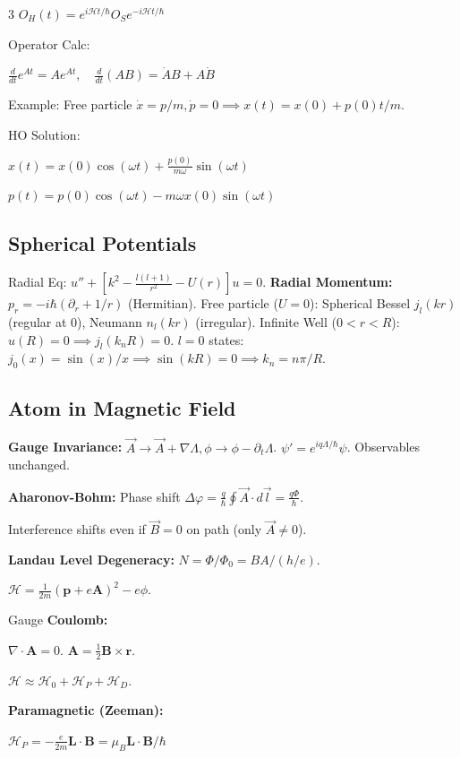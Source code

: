 \documentclass[10pt,a4paper]{article}
\begin{document}
\begin{multicols*}{3}
$O_H(t) = e^{i\mathcal{H}t/\hbar} O_S e^{-i\mathcal{H}t/\hbar}$

Operator Calc: 

$\frac{d}{dt}e^{At} = A e^{At}, \quad \frac{d}{dt}(AB) = \dot{A}B + A\dot{B}$

Example: Free particle $\dot{x} = p/m, \dot{p} = 0 \implies x(t) = x(0) + p(0)t/m$.

HO Solution: 

$x(t) = x(0)\cos(\omega t) + \frac{p(0)}{m\omega}\sin(\omega t)$

$p(t) = p(0)\cos(\omega t) - m\omega x(0)\sin(\omega t)$

\subsection*{Spherical Potentials}
Radial Eq: $u'' + [k^2 - \frac{l(l+1)}{r^2} - U(r)]u = 0$.
\textbf{Radial Momentum:} $p_r = -i\hbar(\partial_r + 1/r)$ (Hermitian).
Free particle ($U=0$): Spherical Bessel $j_l(kr)$ (regular at 0), Neumann $n_l(kr)$ (irregular).
Infinite Well ($0 < r < R$): $u(R)=0 \implies j_l(k_n R) = 0$.
$l=0$ states: $j_0(x) = \sin(x)/x \implies \sin(kR)=0 \implies k_n = n\pi/R$.

\subsection*{Atom in Magnetic Field}
\textbf{Gauge Invariance:} $\vec{A} \to \vec{A} + \nabla\Lambda, \phi \to \phi - \partial_t\Lambda$.
$\psi' = e^{iq\Lambda/\hbar}\psi$. Observables unchanged.

\textbf{Aharonov-Bohm:} Phase shift $\Delta\varphi = \frac{q}{\hbar} \oint \vec{A}\cdot d\vec{l} = \frac{q\Phi}{\hbar}$.

Interference shifts even if $\vec{B}=0$ on path (only $\vec{A} \neq 0$).

\textbf{Landau Level Degeneracy:} $N = \Phi / \Phi_0 = BA / (h/e)$.

$\mathcal{H} = \frac{1}{2m}(\mathbf{p} + e\mathbf{A})^2 - e\phi$. 

Gauge \textbf{Coulomb:} 

$\nabla \cdot \mathbf{A} = 0$. $\mathbf{A} = \frac{1}{2}\mathbf{B} \times \mathbf{r}$.

$\mathcal{H} \approx \mathcal{H}_0 + \mathcal{H}_P + \mathcal{H}_D$.

\textbf{Paramagnetic (Zeeman):}

$\mathcal{H}_P = -\frac{e}{2m} \mathbf{L} \cdot \mathbf{B} = \mu_B \mathbf{L} \cdot \mathbf{B} / \hbar$


\end{multicols*}
\end{document}
